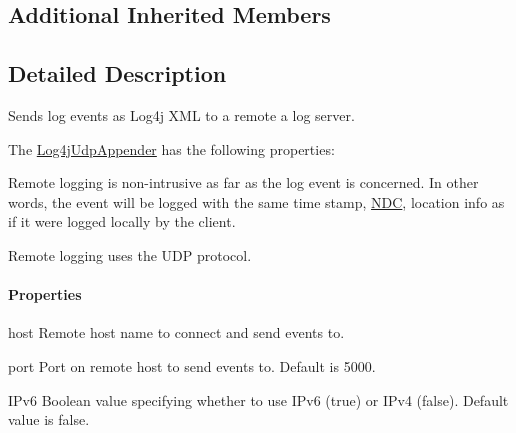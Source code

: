 \subsection*{Additional Inherited Members}


\subsection{Detailed Description}
Sends log events as Log4j X\-M\-L to a remote a log server.

The \hyperlink{classlog4cplus_1_1Log4jUdpAppender}{Log4j\-Udp\-Appender} has the following properties\-:


\begin{DoxyItemize}
\item Remote logging is non-\/intrusive as far as the log event is concerned. In other words, the event will be logged with the same time stamp, \hyperlink{classlog4cplus_1_1NDC}{N\-D\-C}, location info as if it were logged locally by the client.


\item Remote logging uses the U\-D\-P protocol. 
\end{DoxyItemize}

\paragraph*{Properties}


\begin{DoxyDescription}
\item[{\ttfamily host} ]Remote host name to connect and send events to.


\item[{\ttfamily port} ]Port on remote host to send events to. Default is 5000.


\item[{\ttfamily I\-Pv6} ]Boolean value specifying whether to use I\-Pv6 (true) or I\-Pv4 (false). Default value is false.


\end{DoxyDescription}

